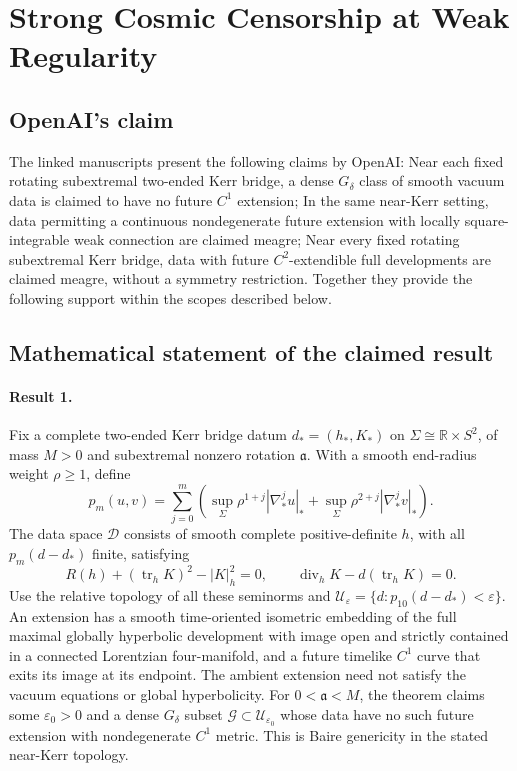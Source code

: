 \documentclass[11pt]{article}
\begin{document}
\section*{Strong Cosmic Censorship at Weak Regularity}

\subsection{OpenAI's claim}
The linked manuscripts present the following claims by OpenAI: Near each fixed rotating subextremal two-ended Kerr bridge, a dense $G_\delta$ class of smooth vacuum data is claimed to have no future $C^1$ extension; In the same near-Kerr setting, data permitting a continuous nondegenerate future extension with locally square-integrable weak connection are claimed meagre; Near every fixed rotating subextremal Kerr bridge, data with future $C^2$-extendible full developments are claimed meagre, without a symmetry restriction. Together they provide the following support within the scopes described below.

\subsection{Mathematical statement of the claimed result}
\paragraph{Result 1.} Fix a complete two-ended Kerr bridge datum \(d_*=(h_*,K_*)\) on \(\Sigma\cong\mathbb R\times S^2\), of mass \(M>0\) and subextremal nonzero rotation \(\mathfrak a\). With a smooth end-radius weight \(\rho\ge1\), define
\[
 p_m(u,v)=\sum_{j=0}^m\left(\sup_\Sigma\rho^{1+j}|\nabla_*^ju|_*+
 \sup_\Sigma\rho^{2+j}|\nabla_*^jv|_*\right).
\]
The data space \(\mathcal D\) consists of smooth complete positive-definite \(h\), with all \(p_m(d-d_*)\) finite, satisfying
\[
 R(h)+(\operatorname{tr}_hK)^2-|K|_h^2=0,\qquad
 \operatorname{div}_hK-d(\operatorname{tr}_hK)=0.
\]
Use the relative topology of all these seminorms and \(\mathcal U_\varepsilon=\{d:p_{10}(d-d_*)<\varepsilon\}\). An extension has a smooth time-oriented isometric embedding of the full maximal globally hyperbolic development with image open and strictly contained in a connected Lorentzian four-manifold, and a future timelike \(C^1\) curve that exits its image at its endpoint. The ambient extension need not satisfy the vacuum equations or global hyperbolicity. For \(0<\mathfrak a<M\), the theorem claims some \(\varepsilon_0>0\) and a dense \(G_\delta\) subset \(\mathcal G\subset\mathcal U_{\varepsilon_0}\) whose data have no such future extension with nondegenerate \(C^1\) metric. This is Baire genericity in the stated near-Kerr topology.
\end{document}

